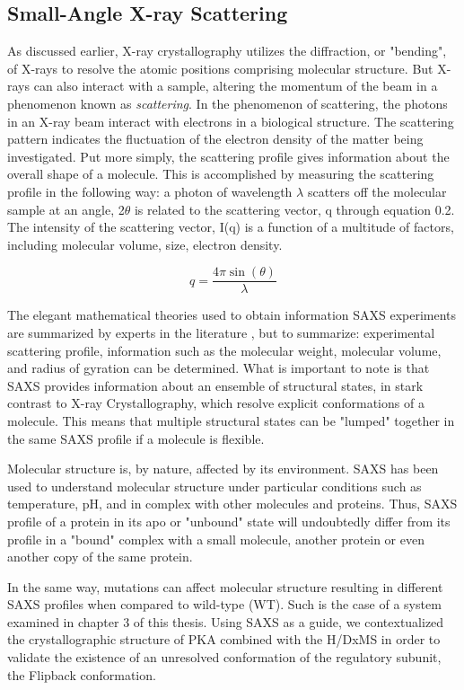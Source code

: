 \documentclass[12pt]{ucsddissertation}
\begin{document}
\begin{dissertationintroduction}
\subsection{Small-Angle X-ray Scattering}
As discussed earlier, X-ray crystallography utilizes the diffraction, or "bending", of X-rays to resolve the atomic positions comprising molecular structure. But X-rays can also interact with a sample, altering the momentum of the beam in a phenomenon known as \textit{scattering}. In the phenomenon of scattering, the photons in an X-ray beam interact with electrons in a biological structure. The scattering pattern indicates the fluctuation of the electron density of the matter being investigated. Put more simply, the scattering profile gives information about the overall shape of a molecule. This is accomplished by measuring the scattering profile in the following way: a photon of wavelength $\lambda$ scatters off the molecular sample at an angle, 2$\theta$ is related to the scattering vector, q through equation 0.2. The intensity of the scattering vector, I(q) is a function of a multitude of factors, including molecular volume, size, electron density. 

\begin{equation}
    q = \frac { 4 \pi \sin ( \theta ) } { \lambda }
\end{equation}

The elegant mathematical theories used to obtain information SAXS experiments are summarized by experts in the literature \cite{Boldon2015}, but to summarize: experimental scattering profile, information such as the molecular weight, molecular volume, and radius of gyration can be determined. What is important to note is that SAXS provides information about an ensemble of structural states, in stark contrast to X-ray Crystallography, which resolve explicit conformations of a molecule. This means that multiple structural states can be "lumped" together in the same SAXS profile if a molecule is flexible. 

 Molecular structure is, by nature, affected by its environment. SAXS has been used to understand molecular structure under particular conditions such as temperature, pH\cite{Carvalho2012}, and in complex with other molecules and proteins\cite{Cheng2009}. Thus, SAXS profile of a protein in its apo or "unbound" state will undoubtedly differ from its profile in a "bound" complex with a small molecule, another protein or even another copy of the same protein. 
 
 In the same way, mutations can affect molecular structure resulting in different SAXS profiles when compared to wild-type (WT). Such is the case of a system examined in chapter 3 of this thesis. Using SAXS as a guide, we contextualized the crystallographic structure of PKA combined with the H/DxMS in order to validate the existence of an unresolved conformation of the regulatory subunit, the Flipback conformation.
 

\end{dissertationintroduction}
\end{document}
